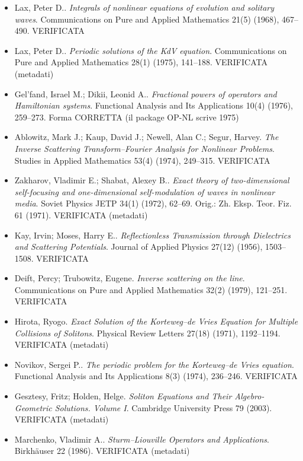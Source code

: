 \begin{itemize}[itemsep=2pt,leftmargin=1.2em,font=\small]
\item Lax, Peter D.. \emph{Integrals of nonlinear equations of evolution and solitary waves}. Communications on Pure and Applied Mathematics 21(5) (1968), 467--490. \textsf{\footnotesize VERIFICATA}
\item Lax, Peter D.. \emph{Periodic solutions of the {KdV} equation}. Communications on Pure and Applied Mathematics 28(1) (1975), 141--188. \textsf{\footnotesize VERIFICATA (metadati)}
\item Gel'fand, Israel M.; Dikii, Leonid A.. \emph{Fractional powers of operators and {H}amiltonian systems}. Functional Analysis and Its Applications 10(4) (1976), 259--273. \textsf{\footnotesize Forma CORRETTA (il package OP-NL scrive 1975)}
\item Ablowitz, Mark J.; Kaup, David J.; Newell, Alan C.; Segur, Harvey. \emph{The Inverse Scattering Transform--{F}ourier Analysis for Nonlinear Problems}. Studies in Applied Mathematics 53(4) (1974), 249--315. \textsf{\footnotesize VERIFICATA}
\item Zakharov, Vladimir E.; Shabat, Alexey B.. \emph{Exact theory of two-dimensional self-focusing and one-dimensional self-modulation of waves in nonlinear media}. Soviet Physics JETP 34(1) (1972), 62--69. \textsf{\footnotesize Orig.: Zh. Eksp. Teor. Fiz. 61 (1971). VERIFICATA (metadati)}
\item Kay, Irvin; Moses, Harry E.. \emph{Reflectionless Transmission through Dielectrics and Scattering Potentials}. Journal of Applied Physics 27(12) (1956), 1503--1508. \textsf{\footnotesize VERIFICATA}
\item Deift, Percy; Trubowitz, Eugene. \emph{Inverse scattering on the line}. Communications on Pure and Applied Mathematics 32(2) (1979), 121--251. \textsf{\footnotesize VERIFICATA}
\item Hirota, Ryogo. \emph{Exact Solution of the {K}orteweg--de {V}ries Equation for Multiple Collisions of Solitons}. Physical Review Letters 27(18) (1971), 1192--1194. \textsf{\footnotesize VERIFICATA (metadati)}
\item Novikov, Sergei P.. \emph{The periodic problem for the {K}orteweg--de {V}ries equation}. Functional Analysis and Its Applications 8(3) (1974), 236--246. \textsf{\footnotesize VERIFICATA}
\item Gesztesy, Fritz; Holden, Helge. \emph{Soliton Equations and Their Algebro-Geometric Solutions. Volume {I}}. Cambridge University Press 79 (2003). \textsf{\footnotesize VERIFICATA (metadati)}
\item Marchenko, Vladimir A.. \emph{Sturm--{L}iouville Operators and Applications}. Birkh{\"a}user 22 (1986). \textsf{\footnotesize VERIFICATA (metadati)}

\end{itemize}
